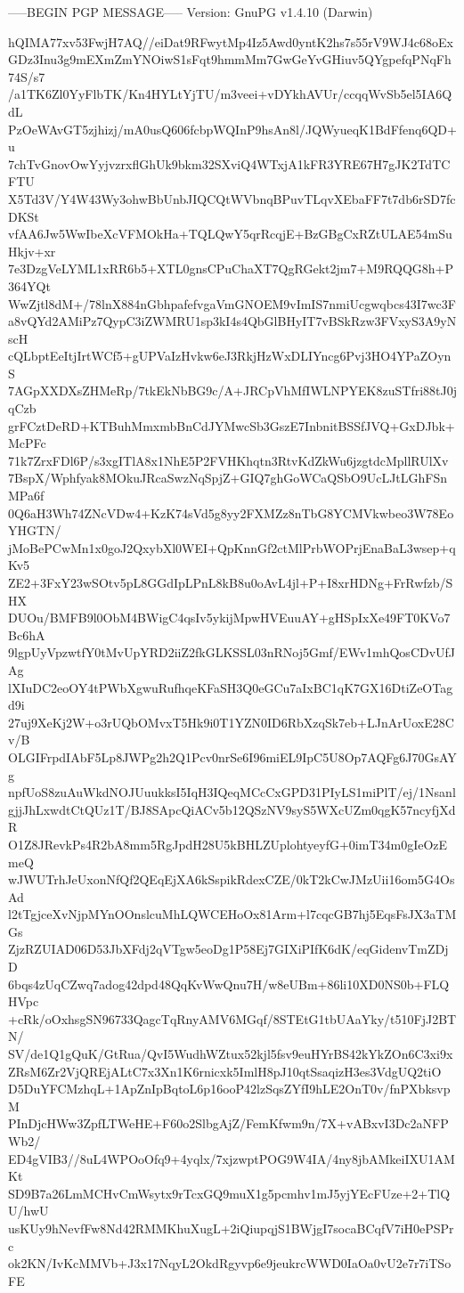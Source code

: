 -----BEGIN PGP MESSAGE-----
Version: GnuPG v1.4.10 (Darwin)

hQIMA77xv53FwjH7AQ//eiDat9RFwytMp4Iz5Awd0yntK2hs7s55rV9WJ4c68oEx
GDz3Inu3g9mEXmZmYNOiwS1sFqt9hmmMm7GwGeYvGHiuv5QYgpefqPNqFh74S/s7
/a1TK6Zl0YyFlbTK/Kn4HYLtYjTU/m3veei+vDYkhAVUr/ccqqWvSb5el5IA6QdL
PzOeWAvGT5zjhizj/mA0usQ606fcbpWQInP9hsAn8l/JQWyueqK1BdFfenq6QD+u
7chTvGnovOwYyjvzrxflGhUk9bkm32SXviQ4WTxjA1kFR3YRE67H7gJK2TdTCFTU
X5Td3V/Y4W43Wy3ohwBbUnbJIQCQtWVbnqBPuvTLqvXEbaFF7t7db6rSD7fcDKSt
vfAA6Jw5WwIbeXcVFMOkHa+TQLQwY5qrRcqjE+BzGBgCxRZtULAE54mSuHkjv+xr
7e3DzgVeLYML1xRR6b5+XTL0gnsCPuChaXT7QgRGekt2jm7+M9RQQG8h+P364YQt
WwZjtl8dM+/78lnX884nGbhpafefvgaVmGNOEM9vImIS7nmiUcgwqbcs43I7wc3F
a8vQYd2AMiPz7QypC3iZWMRU1sp3kI4s4QbGlBHyIT7vBSkRzw3FVxyS3A9yNscH
cQLbptEeItjIrtWCf5+gUPVaIzHvkw6eJ3RkjHzWxDLIYncg6Pvj3HO4YPaZOynS
7AGpXXDXsZHMeRp/7tkEkNbBG9c/A+JRCpVhMfIWLNPYEK8zuSTfri88tJ0jqCzb
grFCztDeRD+KTBuhMmxmbBnCdJYMwcSb3GszE7InbnitBSSfJVQ+GxDJbk+McPFc
71k7ZrxFDl6P/s3xgITlA8x1NhE5P2FVHKhqtn3RtvKdZkWu6jzgtdcMpllRUlXv
7BspX/Wphfyak8MOkuJRcaSwzNqSpjZ+GIQ7ghGoWCaQSbO9UcLJtLGhFSnMPa6f
0Q6aH3Wh74ZNcVDw4+KzK74sVd5g8yy2FXMZz8nTbG8YCMVkwbeo3W78EoYHGTN/
jMoBePCwMn1x0goJ2QxybXl0WEI+QpKnnGf2ctMlPrbWOPrjEnaBaL3wsep+qKv5
ZE2+3FxY23wSOtv5pL8GGdIpLPnL8kB8u0oAvL4jl+P+I8xrHDNg+FrRwfzb/SHX
DUOu/BMFB9l0ObM4BWigC4qsIv5ykijMpwHVEuuAY+gHSpIxXe49FT0KVo7Bc6hA
9lgpUyVpzwtfY0tMvUpYRD2iiZ2fkGLKSSL03nRNoj5Gmf/EWv1mhQosCDvUfJAg
lXIuDC2eoOY4tPWbXgwuRufhqeKFaSH3Q0eGCu7aIxBC1qK7GX16DtiZeOTagd9i
27uj9XeKj2W+o3rUQbOMvxT5Hk9i0T1YZN0ID6RbXzqSk7eb+LJnArUoxE28Cv/B
OLGIFrpdIAbF5Lp8JWPg2h2Q1Pcv0nrSe6I96miEL9IpC5U8Op7AQFg6J70GsAYg
npfUoS8zuAuWkdNOJUuukksI5IqH3IQeqMCcCxGPD31PIyLS1miPlT/ej/1Nsanl
gjjJhLxwdtCtQUz1T/BJ8SApcQiACv5b12QSzNV9syS5WXcUZm0qgK57ncyfjXdR
O1Z8JRevkPs4R2bA8mm5RgJpdH28U5kBHLZUplohtyeyfG+0imT34m0gIeOzEmeQ
wJWUTrhJeUxonNfQf2QEqEjXA6kSspikRdexCZE/0kT2kCwJMzUii16om5G4OsAd
l2tTgjceXvNjpMYnOOnslcuMhLQWCEHoOx81Arm+l7cqcGB7hj5EqsFsJX3aTMGs
ZjzRZUIAD06D53JbXFdj2qVTgw5eoDg1P58Ej7GIXiPIfK6dK/eqGidenvTmZDjD
6bqs4zUqCZwq7adog42dpd48QqKvWwQnu7H/w8eUBm+86li10XD0NS0b+FLQHVpc
+cRk/oOxhsgSN96733QagcTqRnyAMV6MGqf/8STEtG1tbUAaYky/t510FjJ2BTN/
SV/de1Q1gQuK/GtRua/QvI5WudhWZtux52kjl5fsv9euHYrBS42kYkZOn6C3xi9x
ZRsM6Zr2VjQREjALtC7x3Xn1K6rnicxk5ImlH8pJ10qtSsaqizH3es3VdgUQ2tiO
D5DuYFCMzhqL+1ApZnIpBqtoL6p16ooP42lzSqsZYfI9hLE2OnT0v/fnPXbksvpM
PInDjcHWw3ZpfLTWeHE+F60o2SlbgAjZ/FemKfwm9n/7X+vABxvI3Dc2aNFPWb2/
ED4gVIB3//8uL4WPOoOfq9+4yqlx/7xjzwptPOG9W4IA/4ny8jbAMkeiIXU1AMKt
SD9B7a26LmMCHvCmWsytx9rTcxGQ9muX1g5pcmhv1mJ5yjYEcFUze+2+TlQU/hwU
usKUy9hNevfFw8Nd42RMMKhuXugL+2iQiupqjS1BWjgI7socaBCqfV7iH0ePSPrc
ok2KN/IvKcMMVb+J3x17NqyL2OkdRgyvp6e9jeukrcWWD0IaOa0vU2e7r7iTSoFE
